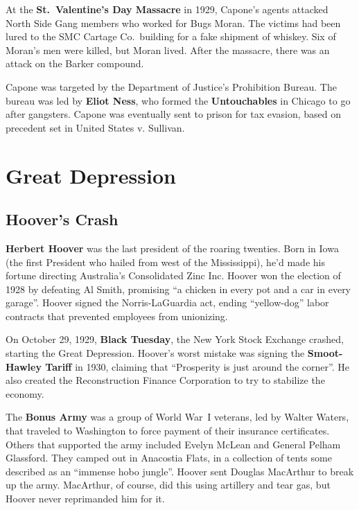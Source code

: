 At the \textbf{St.\ Valentine's Day Massacre} in 1929,
Capone's agents attacked North Side Gang members who worked for Bugs Moran.
The victims had been lured to the SMC Cartage Co.\ building for a fake shipment of whiskey.
Six of Moran's men were killed, but Moran lived.
After the massacre, there was an attack on the Barker compound.

Capone was targeted by the Department of Justice's Prohibition Bureau.
The bureau was led by \textbf{Eliot Ness},
who formed the \textbf{Untouchables} in Chicago to go after gangsters.
Capone was eventually sent to prison for tax evasion,
based on precedent set in United States v. Sullivan.

\section{Great Depression}

\subsection*{Hoover's Crash}

\textbf{Herbert Hoover} was the last president of the roaring twenties.
Born in Iowa (the first President who hailed from west of the Mississippi),
he'd made his fortune directing Australia's Consolidated Zinc Inc.
Hoover won the election of 1928 by defeating Al Smith,
promising ``a chicken in every pot and a car in every garage''.
Hoover signed the Norris-LaGuardia act,
ending ``yellow-dog'' labor contracts that prevented employees from unionizing.

On October 29, 1929, \textbf{Black Tuesday}, the New York Stock Exchange crashed, starting the Great Depression.
Hoover's worst mistake was signing the \textbf{Smoot-Hawley Tariff} in 1930,
claiming that ``Prosperity is just around the corner''.
He also created the Reconstruction Finance Corporation to try to stabilize the economy.

The \textbf{Bonus Army} was a group of World War~I veterans, led by Walter Waters,
that traveled to Washington to force payment of their insurance certificates.
Others that supported the army included Evelyn McLean and General Pelham Glassford.
They camped out in Anacostia Flats,
in a collection of tents some described as an ``immense hobo jungle''.
Hoover sent Douglas MacArthur to break up the army.
MacArthur, of course, did this using artillery and tear gas,
but Hoover never reprimanded him for it.

